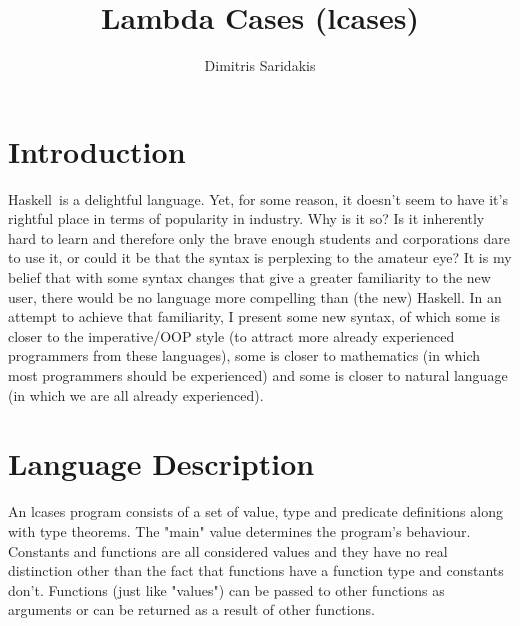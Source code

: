 \documentclass{article}
\date{}
\author{
  Dimitris Saridakis
}
\def\H{Haskell}
\begin{document}
\title{
\textbf{Lambda Cases (lcases)}
}
\maketitle

\tableofcontents

\section{Introduction}

\H\ is a delightful language. Yet, for some reason, it doesn't seem to have it's 
rightful place in terms of popularity in industry. Why is it so?
Is it inherently hard to learn
and therefore only the brave enough students and corporations dare to use it, or
could it be that the syntax is perplexing to the amateur eye? It is my belief that 
with some syntax changes that give a greater familiarity to the new user, there
would be no language more compelling than (the new) \H. In an attempt to achieve
that familiarity, I present some new syntax, of which
some is closer to the imperative/OOP style (to attract more already experienced
programmers from these languages), some is closer to mathematics (in which most 
programmers should be experienced) and some is closer to natural language
(in which we are all already experienced). 

\section{Language Description}

An lcases program consists of a set of value, type and predicate definitions along
with type theorems. The "main" value determines the program's behaviour.
Constants and functions are all considered values and they have no real distinction
other than the fact that functions have a function type and constants don't.
Functions (just like "values") can be passed to other functions as arguments or can
be returned as a result of other functions. 
\end{document}
